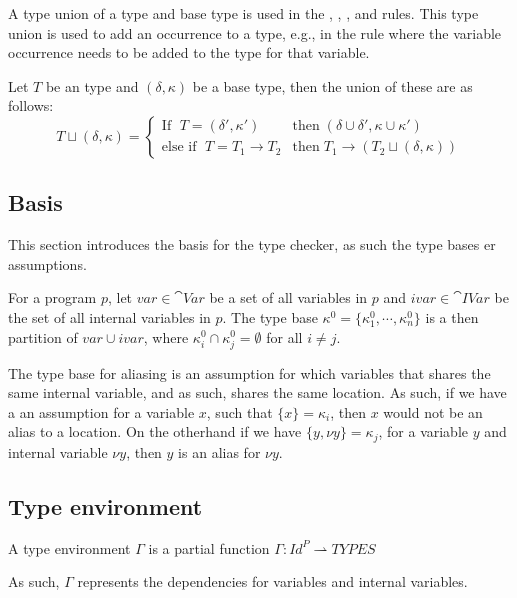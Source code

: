 \documentclass[../../master.tex]{subfiles}
\begin{document}
A type union of a type and base type is used in the , , , and  rules.
This type union is used to add an occurrence to a type, e.g., in the  rule where the variable occurrence needs to be added to the type for that variable.
\begin{definition}
	Let $T$ be an type and $(\delta,\kappa)$ be a base type, then the union of these are as follows:
	\begin{equation*}
		T\sqcup (\delta,\kappa)=
		\left\{\begin{matrix}
			\mbox{If } \; T=(\delta',\kappa')  & \mbox{then} \; (\delta\cup\delta',\kappa\cup\kappa')\\
			\mbox{else if } \; T=T_1\rightarrow T_2 & \mbox{then} \; T_1\rightarrow(T_2\sqcup (\delta,\kappa))
		\end{matrix}\right.
	\end{equation*}
\end{definition}

\subsection{Basis}
This section introduces the basis for the type checker, as such the type bases er assumptions.
\begin{definition}
	For a program $p$, let $var\in\cat{Var}$ be a set of all variables in $p$ and $ivar\in\cat{IVar}$ be the set of all internal variables in $p$.
	The type base $\kappa^0=\{\kappa^0_1,\cdots,\kappa^0_n\}$ is a then partition of $var\cup ivar$, where $\kappa_i^0\cap\kappa_j^0=\emptyset$ for all $i\neq j$.
\end{definition}
The type base for aliasing is an assumption for which variables that shares the same internal variable, and as such, shares the same location.
As such, if we have a an assumption for a variable $x$, such that $\{x\}=\kappa_i$, then $x$ would not be an alias to a location.
On the otherhand if we have $\{y,\nu y\}=\kappa_j$, for a variable $y$ and internal variable $\nu y$, then $y$ is an alias for $\nu y$.

\subsection{Type environment}
\begin{definition}
	A type environment $\Gamma$ is a partial function $\Gamma:Id^P\rightharpoonup TYPES$
\end{definition}
As such, $\Gamma$ represents the dependencies for variables and internal variables.
\end{document}
